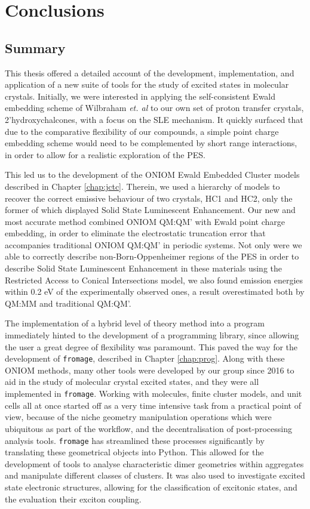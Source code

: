 \chapter*{Conclusions}
\section*{Summary}
This thesis offered a detailed account of the development, implementation, and application of a new suite of tools for the study of excited states in molecular crystals. Initially, we were interested in applying the self-consistent Ewald embedding scheme of Wilbraham \textit{et. al}\cite{Wilbraham2016a} to our own set of proton transfer crystals, 2'hydroxychalcones, with a focus on the SLE mechanism. It quickly surfaced that due to the comparative flexibility of our compounds, a simple point charge embedding scheme would need to be complemented by short range interactions, in order to allow for a realistic exploration of the PES.

This led us to the development of the ONIOM Ewald Embedded Cluster models described in Chapter \ref{chap:jctc}. Therein, we used a hierarchy of models to recover the correct emissive behaviour of two crystals, HC1 and HC2, only the former of which displayed Solid State Luminescent Enhancement. Our new and most accurate method combined ONIOM QM:QM' with Ewald point charge embedding, in order to eliminate the electrostatic truncation error that accompanies traditional ONIOM QM:QM' in periodic systems. Not only were we able to correctly describe non-Born-Oppenheimer regions of the PES in order to describe Solid State Luminescent Enhancement in these materials using the Restricted Access to Conical Intersections model, we also found emission energies within 0.2 eV of the experimentally observed ones, a result overestimated both by QM:MM and traditional QM:QM'.

The implementation of a hybrid level of theory method into a program immediately hinted to the development of a programming library, since allowing the user a great degree of flexibility was paramount. This paved the way for the development of \texttt{fromage}, described in Chapter \ref{chap:prog}. Along with these ONIOM methods, many other tools were developed by our group since 2016 to aid in the study of molecular crystal excited states, and they were all implemented in \texttt{fromage}. Working with molecules, finite cluster models, and unit cells all at once started off as a very time intensive task from a practical point of view, because of the niche geometry manipulation operations which were ubiquitous as part of the workflow, and the decentralisation of post-processing analysis tools. \texttt{fromage} has streamlined these processes significantly by translating these geometrical objects into Python. This allowed for the development of tools to analyse characteristic dimer geometries within aggregates and manipulate different classes of clusters. It was also used to investigate excited state electronic structures, allowing for the classification of excitonic states, and the evaluation their exciton coupling.

